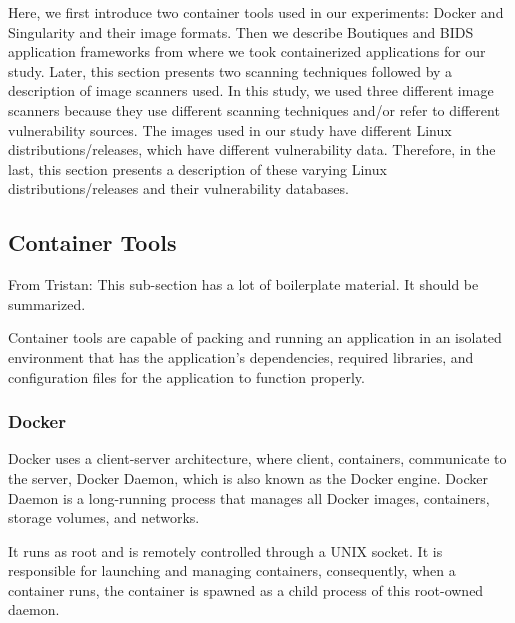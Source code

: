 \documentclass[a4paper,num-refs]{oup-contemporary}
\newcommand{\tristan}[1]{\color{blue}From Tristan: #1\color{black}}
\begin{document}
Here, we first
introduce two container tools used in our experiments: Docker and
Singularity and their image formats. Then we describe Boutiques and BIDS application frameworks
from where we took containerized applications for our study. 
Later, this section
presents two scanning techniques followed by a description of image scanners used.
In this study, we used three different image scanners because they
use different scanning techniques and/or refer to different vulnerability sources.
The images used in our study have different Linux distributions/releases, which have
different vulnerability data. Therefore, in the last, this section presents a
description of these varying Linux distributions/releases and their
vulnerability databases.



\subsection{Container Tools}

\tristan{This sub-section has a lot of boilerplate material. It should be summarized.}

Container tools are capable of packing and running an application in an isolated environment that has
the application's dependencies,
required libraries, and configuration files for the
application to function properly.

\subsubsection{Docker}

Docker uses a client-server architecture, where client, containers, communicate to
the server, Docker Daemon, which is also known as the Docker engine.
Docker Daemon is a long-running process that manages all Docker images, containers, storage volumes, and networks.

%
%
%
It runs as root and is remotely controlled through a
UNIX socket. It is responsible for launching and managing containers,
consequently, when a container runs, the container is spawned as a
child process of this root-owned daemon.
\end{document}
